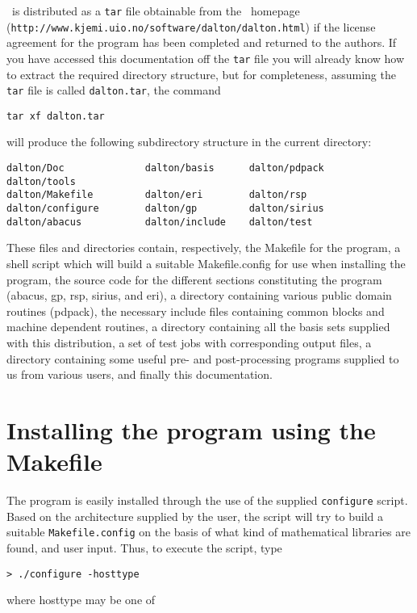           \siraba\ is distributed as a \verb|tar| file obtainable from
the \siraba\ homepage\\
(\verb|http://www.kjemi.uio.no/software/dalton/dalton.html|) if the license
agreement for the program has been completed and returned to the
authors.  If you
have accessed this documentation off the \verb|tar|
file you will
already know how to extract the required directory structure, but
for completeness, assuming the \verb|tar| file is called
\verb|dalton.tar|, the command
\begin{verbatim}
tar xf dalton.tar
\end{verbatim}
will produce the following subdirectory structure in the current
directory:
\begin{verbatim}
dalton/Doc              dalton/basis      dalton/pdpack     dalton/tools
dalton/Makefile         dalton/eri        dalton/rsp
dalton/configure        dalton/gp         dalton/sirius
dalton/abacus           dalton/include    dalton/test
\end{verbatim}
These files and directories contain, respectively, the Makefile for
the program, a shell script which will build a suitable
Makefile.config for use when installing the program, the
source  code for the different sections constituting the program
(abacus, gp, rsp, sirius, and eri), a directory containing
various public domain routines (pdpack), the necessary include files
containing common blocks and
machine dependent routines, a directory containing all the basis sets
supplied with this distribution, a set of test jobs with corresponding
output files, a directory containing some useful pre- and
post-processing programs supplied to us from various users, and
finally this documentation.

\section{Installing the program using the Makefile}\label{sec:Makefile}

The program is easily installed through the use of the supplied
\verb|configure| script. Based on the
architecture supplied by the user, the
script will try to build a suitable
\verb|Makefile.config| on the
basis of what kind of mathematical libraries are found, and user
input. Thus, to execute the script, type

\begin{verbatim}
> ./configure -hosttype
\end{verbatim}
where hosttype may be one of

